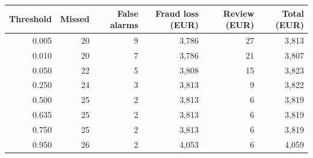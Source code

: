 \begin{tabular}{r r r r r r}
\hline
\textbf{Threshold} & \textbf{Missed} & \textbf{False alarms} & \textbf{Fraud loss (EUR)} & \textbf{Review (EUR)} & \textbf{Total (EUR)} \\
\hline
0.005 & 20 & 9 & 3{,}786 & 27 & 3{,}813 \\
0.010 & 20 & 7 & 3{,}786 & 21 & 3{,}807 \\
0.050 & 22 & 5 & 3{,}808 & 15 & 3{,}823 \\
0.250 & 24 & 3 & 3{,}813 & 9 & 3{,}822 \\
0.500 & 25 & 2 & 3{,}813 & 6 & 3{,}819 \\
0.635 & 25 & 2 & 3{,}813 & 6 & 3{,}819 \\
0.750 & 25 & 2 & 3{,}813 & 6 & 3{,}819 \\
0.950 & 26 & 2 & 4{,}053 & 6 & 4{,}059 \\
\hline
\end{tabular}